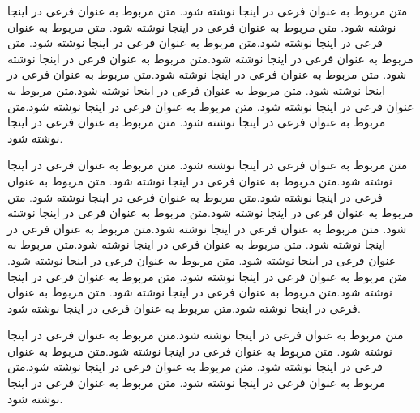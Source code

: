   متن مربوط به عنوان فرعی در اینجا نوشته شود. متن مربوط به عنوان فرعی در اینجا نوشته شود. متن مربوط به عنوان فرعی در اینجا نوشته شود. متن مربوط به عنوان فرعی در اینجا نوشته شود.متن مربوط به عنوان فرعی در اینجا نوشته شود. متن مربوط به عنوان فرعی در اینجا نوشته شود.متن مربوط به عنوان فرعی در اینجا نوشته شود. متن مربوط به عنوان فرعی در اینجا نوشته شود.متن مربوط به عنوان فرعی در اینجا نوشته شود. متن مربوط به عنوان فرعی در اینجا نوشته شود.متن مربوط به عنوان فرعی در اینجا نوشته شود. متن مربوط به عنوان فرعی در اینجا نوشته شود.متن مربوط به عنوان فرعی در اینجا نوشته شود. متن مربوط به عنوان فرعی در اینجا نوشته شود.
  
   متن مربوط به عنوان فرعی در اینجا نوشته شود. متن مربوط به عنوان فرعی در اینجا نوشته شود.متن مربوط به عنوان فرعی در اینجا نوشته شود. متن مربوط به عنوان فرعی در اینجا نوشته شود.متن مربوط به عنوان فرعی در اینجا نوشته شود. متن مربوط به عنوان فرعی در اینجا نوشته شود.متن مربوط به عنوان فرعی در اینجا نوشته شود. متن مربوط به عنوان فرعی در اینجا نوشته شود.متن مربوط به عنوان فرعی در اینجا نوشته شود. متن مربوط به عنوان فرعی در اینجا نوشته شود.متن مربوط به عنوان فرعی در اینجا نوشته شود. متن مربوط به عنوان فرعی در اینجا نوشته شود. متن مربوط به عنوان فرعی در اینجا نوشته شود. متن مربوط به عنوان فرعی در اینجا نوشته شود.متن مربوط به عنوان فرعی در اینجا نوشته شود. متن مربوط به عنوان فرعی در اینجا نوشته شود.متن مربوط به عنوان فرعی در اینجا نوشته شود. 
   
   متن مربوط به عنوان فرعی در اینجا نوشته شود.متن مربوط به عنوان فرعی در اینجا نوشته شود. متن مربوط به عنوان فرعی در اینجا نوشته شود.متن مربوط به عنوان فرعی در اینجا نوشته شود. متن مربوط به عنوان فرعی در اینجا نوشته شود.متن مربوط به عنوان فرعی در اینجا نوشته شود. متن مربوط به عنوان فرعی در اینجا نوشته شود.